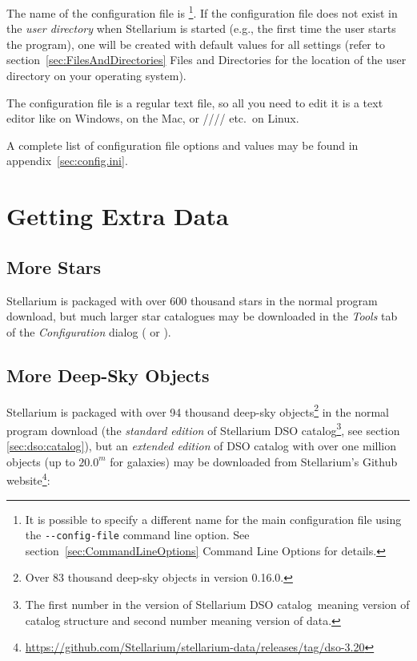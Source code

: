 The name of the configuration file is
\footnote{It is possible to specify a different name
  for the main configuration file using the \texttt{-\/-config-file}
  command line option. See section~\ref{sec:CommandLineOptions} Command 
  Line Options for details.}.
If the configuration file does not exist in the \emph{user directory}
when Stellarium is started (e.g., the first time the user starts the
program), one will be created with default values for all settings
(refer to section~\ref{sec:FilesAndDirectories} Files and
Directories for the location of the user directory on your operating
system).


The configuration file is a regular text file, so all you need to edit
it is a text editor like  on Windows,  on
the Mac, or //// etc.\ on Linux.

A complete list of configuration file options and values may be found
in appendix~\ref{sec:config.ini}.


\section{Getting Extra Data}
\label{sec:ExtraData}

\subsection{More Stars}
\label{sec:ExtraData:stars}
Stellarium is packaged with over 600 thousand stars in the normal
program download, but much larger star catalogues may be downloaded
in the \emph{Tools} tab of the \emph{Configuration} dialog ( or
).

\subsection{More Deep-Sky Objects}
\label{sec:ExtraData:DSOs}

\noindent{}Stellarium is packaged with over 94 thousand deep-sky 
objects\footnote{Over 83 thousand deep-sky objects in version 0.16.0.} in the normal
program download (the \emph{standard edition} of Stellarium DSO catalog\footnote{The first 
number in the version of Stellarium DSO catalog meaning version of catalog structure 
and second number meaning version of data.}, see section \ref{sec:dso:catalog}), 
but an \emph{extended edition} of DSO catalog with over one million objects (up to $20.0^m$ for galaxies) may be downloaded
from Stellarium's Github website\footnote{\url{https://github.com/Stellarium/stellarium-data/releases/tag/dso-3.20}}:

